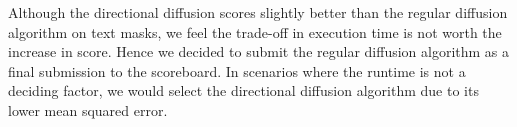 Although the directional diffusion scores slightly better than the regular diffusion algorithm on text masks, we feel the trade-off in execution time is not worth the increase in score. Hence we decided to submit the regular diffusion algorithm as a final submission to the scoreboard. In scenarios where the runtime is not a deciding factor, we would select the directional diffusion algorithm due to its lower mean squared error.